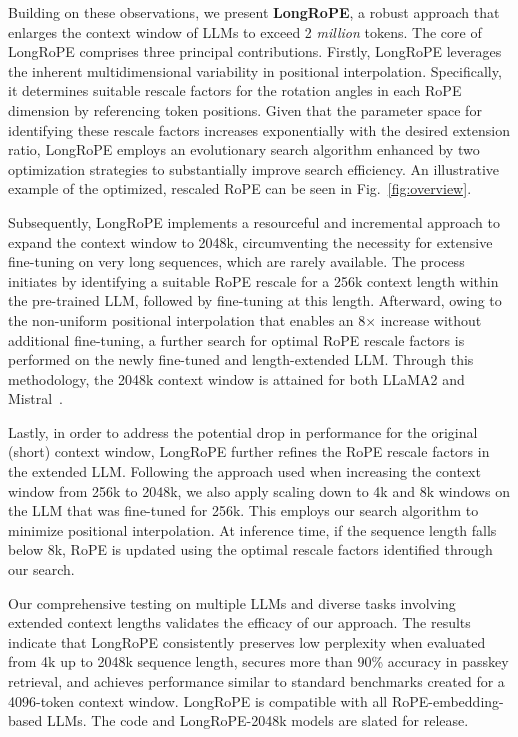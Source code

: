 Building on these observations, we present \textbf{LongRoPE}, a robust approach that enlarges the context window of LLMs to exceed 2 \emph{million} tokens. The core of LongRoPE comprises three principal contributions. Firstly, {LongRoPE} leverages the inherent multidimensional variability in positional interpolation. Specifically, it determines suitable rescale factors for the rotation angles in each RoPE dimension by referencing token positions. Given that the parameter space for identifying these rescale factors increases exponentially with the desired extension ratio, {LongRoPE} employs an evolutionary search algorithm enhanced by two optimization strategies to substantially improve search efficiency. An illustrative example of the optimized, rescaled RoPE can be seen in Fig.~\ref{fig:overview}.

Subsequently, {LongRoPE} implements a resourceful and incremental approach to expand the context window to 2048k, circumventing the necessity for extensive fine-tuning on very long sequences, which are rarely available. The process initiates by identifying a suitable RoPE rescale for a 256k context length within the pre-trained LLM, followed by fine-tuning at this length. Afterward, owing to the non-uniform positional interpolation that enables an 8$\times$ increase without additional fine-tuning, a further search for optimal RoPE rescale factors is performed on the newly fine-tuned and length-extended LLM. Through this methodology, the 2048k context window is attained for both LLaMA2 and Mistral~\cite{mistral}.

Lastly, in order to address the potential drop in performance for the original (short) context window, {LongRoPE} further refines the RoPE rescale factors in the extended LLM. Following the approach used when increasing the context window from 256k to 2048k, we also apply scaling down to 4k and 8k windows on the LLM that was fine-tuned for 256k. This employs our search algorithm to minimize positional interpolation. At inference time, if the sequence length falls below 8k, RoPE is updated using the optimal rescale factors identified through our search.

Our comprehensive testing on multiple LLMs and diverse tasks involving extended context lengths validates the efficacy of our approach. The results indicate that LongRoPE consistently preserves low perplexity when evaluated from 4k up to 2048k sequence length, secures more than 90\% accuracy in passkey retrieval, and achieves performance similar to standard benchmarks created for a 4096-token context window. LongRoPE is compatible with all RoPE-embedding-based LLMs. The code and LongRoPE-2048k models are slated for release.

